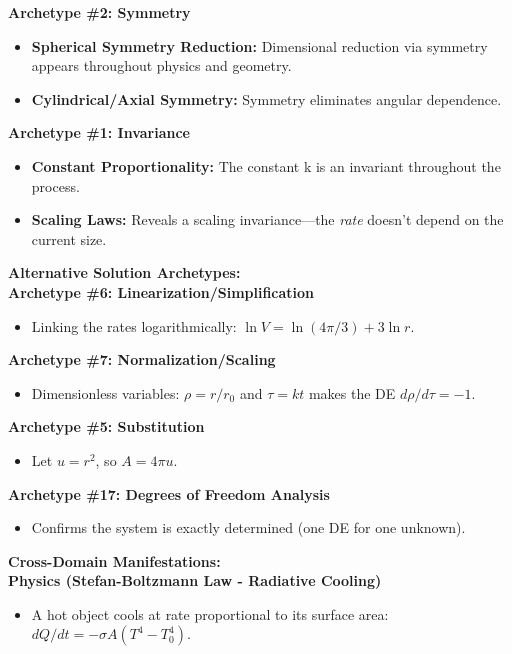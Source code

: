 \documentclass{article}
\begin{document}
\noindent \textbf{Archetype \#2: Symmetry}
\begin{itemize}
    \item \textbf{Spherical Symmetry Reduction:} Dimensional reduction via symmetry appears throughout physics and geometry.
    \item \textbf{Cylindrical/Axial Symmetry:} Symmetry eliminates angular dependence.
\end{itemize}

\noindent \textbf{Archetype \#1: Invariance}
\begin{itemize}
    \item \textbf{Constant Proportionality:} The constant k is an invariant throughout the process.
    \item \textbf{Scaling Laws:} Reveals a scaling invariance—the \textit{rate} doesn't depend on the current size.
\end{itemize}

\noindent \textbf{Alternative Solution Archetypes:} \\

\noindent \textbf{Archetype \#6: Linearization/Simplification}
\begin{itemize}
    \item Linking the rates logarithmically: $\ln V = \ln(4\pi/3) + 3 \ln r$.
\end{itemize}

\noindent \textbf{Archetype \#7: Normalization/Scaling}
\begin{itemize}
    \item Dimensionless variables: $\rho = r/r_0$ and $\tau = kt$ makes the DE $d\rho/d\tau = -1$.
\end{itemize}

\noindent \textbf{Archetype \#5: Substitution}
\begin{itemize}
    \item Let $u = r^2$, so $A = 4\pi u$.
\end{itemize}

\noindent \textbf{Archetype \#17: Degrees of Freedom Analysis}
\begin{itemize}
    \item Confirms the system is exactly determined (one DE for one unknown).
\end{itemize}

\noindent \textbf{Cross-Domain Manifestations:} \\

\noindent \textbf{Physics (Stefan-Boltzmann Law - Radiative Cooling)}
\begin{itemize}
    \item A hot object cools at rate proportional to its surface area: $dQ/dt = -\sigma A(T^4 - T_0^4)$.
\end{itemize}
\end{document}
